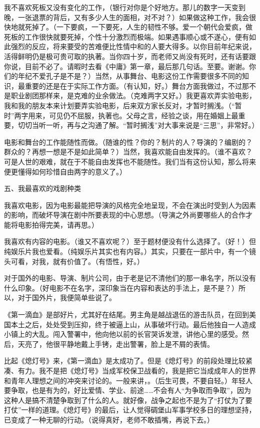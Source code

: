 \par 我不喜欢死板又没有变化的工作，（银行对你是个好地方。那儿的数字一天变到晚，一张退票的背后，又有多少人生的面相，对不对？）如果做这种工作，我会很快地就死掉了。（一下要疯，一下要死，人生的韧性不够。爱一个朝代会爱疯，做死板的工作很快就要死掉，个性十分激烈而极端。如果遇事顺心或不遂心，便有如此强烈的反应，将来要受的苦难便比性情中和的人要大得多。以你目前年纪来说，活得鲜明仍是极可贵可取的执著。当你四十岁，而老师又尚没有死时，还有话要跟你说，目前不必了。请暇时去看《中庸》第一章，最后那几句话。至要。谢谢。你们的年纪不爱孔子是不是？）当然，从事舞台、电影这份工作需要很多不同的知识，最重要的还是在于实际工作方面。（有认知，好。）舞台方面我做过，不过那不是职业剧团那样来，是克难的业余做法。（克难两字又好。）我更喜欢弄实验电影，我和我的朋友本来计划要弄实验电影，后来双方家长反对，才暂时搁浅。（“暂时”两字用来，可见仍不屈服，执著也。父母之言，经验之谈，用在婚姻上最重要，切切当听一听，再与之沟通了解。“暂时搁浅”对大事来说是“三思”，非常好。）
\par 电影和舞台的工作能随性而做。（随谁的性？你的？制片的人？导演的？编剧的？群众的？再想一想是不是如此简单？）当然，我喜欢能自由发挥的。（谁不喜欢？可是人世的艰难，就在于不能自由发挥也不能随性。我们当有这份认知，那么将来便更懂得如何珍惜自由两字的意义了。）
\par 五、我最喜欢的戏剧种类
\par 我喜欢电影，因为电影最能把导演的风格完全地呈现，不会在演出时受到人为因素的影响，而破坏导演在剧中所要表现的中心思想。（导演之外尚要哪些人的合作才能将电影拍得完美，请再思。）
\par 我喜欢有内容的电影。（谁又不喜欢呢？）至于题材便没有什么选择了。（好！）但纯娱乐片我也爱看。（纯娱乐片其实也有内容。）其实，只要在一部片中，有一个镜头可看，对我，就有价值了。（有悟性，好。）
\par 对于国外的电影、导演、制片公司，由于老是记不清他们的那一串名字，所以没有什么印象。（好电影不在名字，深印象当在内容和表达的手法上，是不是？）所以，对于国外片，我便简单些说了。
\par 《第一滴血》是部好片，尤其好在结尾。男主角是越战退伍的游击队员，在回到美国本土之后，处处受到压抑，终于被逼上山，从事破坏行动。最后他独自一人造成小镇上的大乱。闯入警署中，他向他以前的长官哭诉发泄，讲他心里的感受。然后，天亮了，他很平静地戴上手铐，走出警署，脸上是不屑的表情。
\par 比起《熄灯号》来，《第一滴血》是太成功了。但是《熄灯号》的前段处理比较紧凑、有力。我不是把《熄灯号》当成军校保卫战看的，我是把它当成成年人的世界和青年人理想之间的冲突来讨论的。一般来讲，。（后生可畏，不要自轻。）年轻人要争取，也是有为的，好比爱情、学业、前途……不会有人“为争取而争取”，因为这种人是搞不清楚争取到了什么的人。就好像，战争之起也不是为了“打仗为了要打仗”一样的道理。《熄灯号》的最后，让人觉得碉堡山军事学校多日的理想坚持，已变成了一种无聊的行动。（说得真好，老师不敢插嘴，再说下去。）
